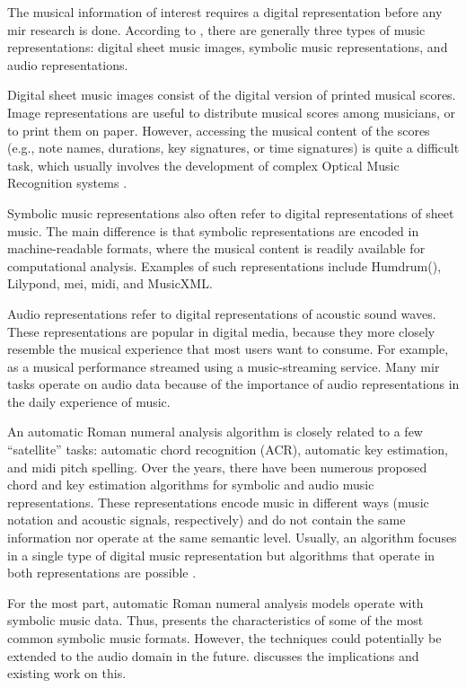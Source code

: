 


The musical information of interest requires a digital
representation before any \gls{mir} research is done.
According to \textcite{muller2015music}, there are generally
three types of music representations: digital sheet music
images, symbolic music representations, and audio
representations.

Digital sheet music images consist of the digital version of
printed musical scores. Image representations are useful to
distribute musical scores among musicians, or to print them
on paper. However, accessing the musical content of the
scores (e.g., note names, durations, key signatures, or time
signatures) is quite a difficult task, which usually
involves the development of complex Optical Music
Recognition systems
\parencite{calvozaragoza2020understanding}.

Symbolic music representations also often refer to digital
representations of sheet music. The main difference is that
symbolic representations are encoded in machine-readable
formats, where the musical content is readily available for
computational analysis. Examples of such representations
include Humdrum(), Lilypond, \gls{mei}, \gls{midi}, and
MusicXML.

Audio representations refer to digital representations of
acoustic sound waves. These representations are popular in
digital media, because they more closely resemble the
musical experience that most users want to consume. For
example, as a musical performance streamed using a
music-streaming service. Many \gls{mir} tasks operate on
audio data because of the importance of audio
representations in the daily experience of music.

An automatic Roman numeral analysis algorithm is closely
related to a few ``satellite'' tasks: automatic chord
recognition (ACR), automatic key estimation, and \gls{midi} pitch
spelling. Over the years, there have been numerous proposed
chord and key estimation algorithms for symbolic and audio
music representations. These representations encode music in
different ways (music notation and acoustic signals,
respectively) and do not contain the same information nor
operate at the same semantic level. Usually, an algorithm
focuses in a single type of digital music representation but
algorithms that operate in both representations are possible
\parencite{napoleslopez2019keyfinding}.

For the most part, automatic Roman numeral analysis models
operate with symbolic music data. Thus,
 presents the
characteristics of some of the most common symbolic music
formats. However, the techniques could potentially be
extended to the audio domain in the future.
 discusses the
implications and existing work on this.

